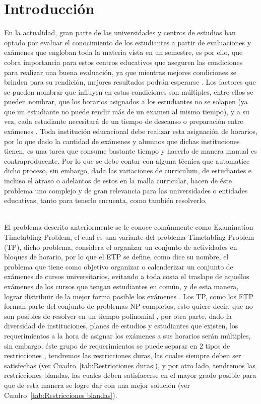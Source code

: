 \section{Introducci\'on}
En la actualidad, gran parte de las universidades y centros de estudios han optado por evaluar el conocimiento de los estudiantes a partir de evaluaciones y exámenes que engloban toda la materia vista en un semestre, es por ello, que cobra importancia para estos centros educativos que aseguren las condiciones para realizar una buena evaluación, ya que mientras mejores condiciones se brinden para su rendición, mejores resultados podrán esperarse \cite{Cita1}. Los factores que se pueden nombrar que influyen en estas condiciones son múltiples, entre ellos se pueden nombrar, que los horarios asignados a los estudiantes no se solapen (ya que un estudiante no puede rendir más de un examen al mismo tiempo), y a su vez, cada estudiante necesitará de un tiempo de descanso o preparación entre exámenes \cite{Cita2}. Toda institución educacional debe realizar esta asignación de horarios, por lo que dado la cantidad de exámenes y alumnos que dichas instituciones tienen, es una tarea que consume bastante tiempo y hacerlo de manera manual es contraproducente. Por lo que se debe contar con alguna técnica que automatice dicho proceso, sin embargo, dada las variaciones de curriculum, de estudiantes e incluso el atraso o adelantos de estos en la malla curricular, hacen de éste problema uno complejo y de gran relevancia para las universidades o entidades educativas, tanto para tenerlo encuenta, como también resolverlo. 
\begin{itemize}
\end{itemize}
\\
El problema descrito anteriormente se le conoce comúnmente como Examination Timetabling Problem, el cual es una variante del problema Timetabling Problem (TP), dicho problema, considera el organizar un conjunto de actividades en bloques de horario, por lo que el ETP se define, como dice su nombre, el problema que tiene como objetivo organizar o calenderizar un conjunto de exámenes de cursos universitarios, evitando a toda costa el traslape de aquellos exámenes de los cursos que tengan estudiantes en común, y de esta manera, lograr distribuir de la mejor forma posible los exámenes \cite{Cita3}. Los TP, como los ETP forman parte del conjunto de problemas NP-completos, esto quiere decir, que no son posibles de resolver en un tiempo polinomial \cite{Cita4}, por otra parte, dado la diversidad de instituciones, planes de estudios y estudiantes que existen, los requerimientos a la hora de asignar los exámenes a sus horarios serán múltiples, sin embargo, éste grupo de requerimientos se puede separar en 2 tipos de restricciones \cite{Cita5}, tendremos las restricciones duras, las cuales siempre deben ser satisfechas (ver Cuadro~\ref{tab:Restricciones duras}), y por otro lado, tendremos las restricciones blandas, las cuales deben satisfacerse en el mayor grado posible para que de esta manera se logre dar con una mejor solución (ver Cuadro~\ref{tab:Restricciones blandas}). 
